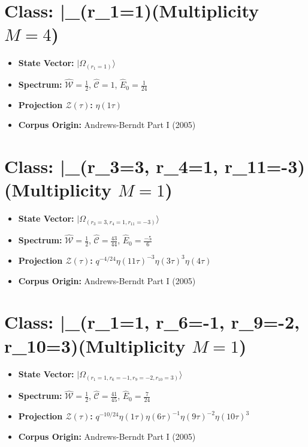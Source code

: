 \documentclass[11pt,twoside,openright]{book}
\begin{document}
\section*{Class: |\Omega_{(r_{1}=1)}\rangle (Multiplicity $M=4$)}
\begin{itemize}
  \item \textbf{State Vector:} $|\Omega_{(r_{1}=1)}\rangle$
  \item \textbf{Spectrum:} $\hat{\mathcal{W}} = \frac{1}{2}$, $\hat{\mathcal{C}} = 1$, $\hat{E}_0 = \frac{1}{24}$
  \item \textbf{Projection $\mathcal{Z}(\tau)$:} $\eta(1\tau)$
  \item \textbf{Corpus Origin:} Andrews-Berndt Part I (2005)
\end{itemize}

\section*{Class: |\Omega_{(r_{3}=3, r_{4}=1, r_{11}=-3)}\rangle (Multiplicity $M=1$)}
\begin{itemize}
  \item \textbf{State Vector:} $|\Omega_{(r_{3}=3, r_{4}=1, r_{11}=-3)}\rangle$
  \item \textbf{Spectrum:} $\hat{\mathcal{W}} = \frac{1}{2}$, $\hat{\mathcal{C}} = \frac{43}{44}$, $\hat{E}_0 = \frac{-5}{6}$
  \item \textbf{Projection $\mathcal{Z}(\tau)$:} $q^{-4/24} \eta(11\tau)^{-3} \eta(3\tau)^{3} \eta(4\tau)$
  \item \textbf{Corpus Origin:} Andrews-Berndt Part I (2005)
\end{itemize}

\section*{Class: |\Omega_{(r_{1}=1, r_{6}=-1, r_{9}=-2, r_{10}=3)}\rangle (Multiplicity $M=1$)}
\begin{itemize}
  \item \textbf{State Vector:} $|\Omega_{(r_{1}=1, r_{6}=-1, r_{9}=-2, r_{10}=3)}\rangle$
  \item \textbf{Spectrum:} $\hat{\mathcal{W}} = \frac{1}{2}$, $\hat{\mathcal{C}} = \frac{41}{45}$, $\hat{E}_0 = \frac{7}{24}$
  \item \textbf{Projection $\mathcal{Z}(\tau)$:} $q^{-10/24} \eta(1\tau) \eta(6\tau)^{-1} \eta(9\tau)^{-2} \eta(10\tau)^{3}$
  \item \textbf{Corpus Origin:} Andrews-Berndt Part I (2005)
\end{itemize}
\end{document}
